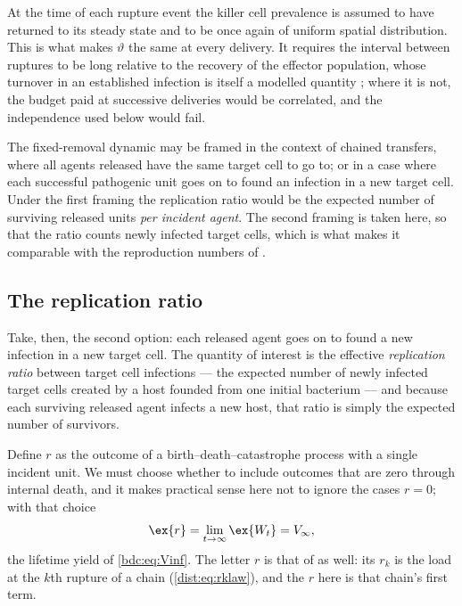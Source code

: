\begin{remark}
\label{path:rem:reset}
At the time of each rupture event the killer cell prevalence is assumed to
have returned to its steady state and to be once again of uniform spatial
distribution. This is what makes $\vartheta$ the same at every delivery. It
requires the interval between ruptures to be long relative to the recovery
of the effector population, whose turnover in an established infection is
itself a modelled quantity \cite{ribeiro2002vdt}; where it is not, the
budget paid at successive deliveries would be correlated, and the
independence used below would fail.
\end{remark}

\begin{remark}
\label{path:rem:onetarget}
The fixed-removal dynamic may be framed in the context of chained transfers,
where all agents released have the same target cell to go to; or in a case
where each successful pathogenic unit goes on to found an infection in a new
target cell. Under the first framing the replication ratio would be the
expected number of surviving released units \emph{per incident agent}. The
second framing is taken here, so that the ratio counts newly infected target
cells, which is what makes it comparable with the reproduction numbers of
\ChPop{}.
\end{remark}

\subsection{The replication ratio}
\label{path:sec:ratio}

Take, then, the second option: each released agent goes on to found a new
infection in a new target cell. The quantity of interest is the effective
\emph{replication ratio} between target cell infections --- the expected
number of newly infected target cells created by a host founded from one
initial bacterium --- and because each surviving released agent infects a new
host, that ratio is simply the expected number of survivors.

Define $r$ as the outcome of a birth--death--catastrophe process with a
single incident unit. We must choose whether to include outcomes that are
zero through internal death, and it makes practical sense here not to ignore
the cases $r=0$; with that choice
\begin{equation}
\ex{r}=\lim_{t\to\infty}\ex{W_t}=V_\infty,
\label{path:eq:Er}
\end{equation}
the lifetime yield of \cref{bdc:eq:Vinf}. The letter $r$ is that of
\ChDist{} as well: its $r_k$ is the load at the $k$th rupture of a chain
(\cref{dist:eq:rklaw}), and the $r$ here is that chain's first term.

